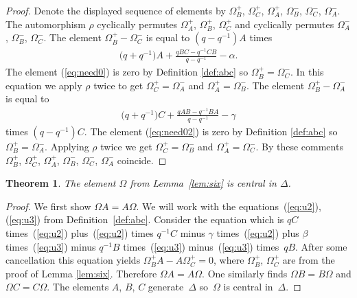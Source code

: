 \documentclass[11pt]{article}
\numberwithin{equation}{section}
\newtheorem{Theorem}{Theorem}[section]
\begin{document}
\begin{proof}
Denote the displayed sequence of elements by
$\Omega^+_B$,
$\Omega^+_C$,
$\Omega^+_A$,
$\Omega^-_B$,
$\Omega^-_C$,
$\Omega^-_A$.
The automorphism
$\rho$ cyclically permutes
$\Omega^+_A$,
$\Omega^+_B$,
$\Omega^+_C$
and cyclically permutes
$\Omega^-_A$, $\Omega^-_B$, $\Omega^-_C$.
The element
$\Omega^+_B-\Omega^-_C$
is
equal to $(q-q^{-1})A$ times
\begin{gather}
\label{eq:need0}
\big(q+q^{-1}\big)A + \frac{qBC-q^{-1}CB}{q-q^{-1}} -\alpha.
\end{gather}
The element
(\ref{eq:need0}) is zero by Def\/inition
\ref{def:abc} so
$\Omega^+_B=\Omega^-_C$.
In this equation we apply $\rho$ twice to get
$\Omega^+_C=\Omega^-_A$
and
$\Omega^+_A=\Omega^-_B$.
The element
$\Omega^+_B-\Omega^-_A$ is equal to
\begin{gather}
\label{eq:need02}
\big(q+q^{-1}\big)C + \frac{qAB-q^{-1}BA}{q-q^{-1}} -\gamma
\end{gather}
times $(q-q^{-1})C$.
The element
(\ref{eq:need02}) is zero by Def\/inition
\ref{def:abc} so
$\Omega^+_B=\Omega^-_A$.
Applying $\rho$ twice we get
$\Omega^+_C=\Omega^-_B$
and
$\Omega^+_A=\Omega^-_C$.
By these comments
$\Omega^+_B$,
$\Omega^+_C$,
$\Omega^+_A$,
$\Omega^-_B$,
$\Omega^-_C$,
$\Omega^-_A$ coincide.
\end{proof}

\begin{Theorem}
\label{lem:center}
The element $\Omega$ from
Lemma~{\rm \ref{lem:six}} is central in $\Delta $.
\end{Theorem}

\begin{proof}
We f\/irst show $\Omega A = A \Omega $.
We will work with the equations~(\ref{eq:u2}),
(\ref{eq:u3}) from Def\/inition~\ref{def:abc}. Consider the equation which is
$qC $ times~(\ref{eq:u2}) plus~(\ref{eq:u2}) times $q^{-1}C$
minus $\gamma$ times~(\ref{eq:u2})
plus $\beta$ times~(\ref{eq:u3})
minus
$q^{-1}B$ times~(\ref{eq:u3})
minus~(\ref{eq:u3}) times~$qB$.
After some cancellation this equation yields
$\Omega^+_B A- A\Omega^+_C =0$, where
$\Omega^+_B$, $\Omega^+_C$
are from the proof of Lemma
\ref{lem:six}.
Therefore
$\Omega A= A\Omega $.
 One similarly
f\/inds
$
\Omega B = B \Omega$ and
$
\Omega C = C \Omega$.
The elements $A$, $B$, $C$ generate~$\Delta $ so~$\Omega$ is central in~$\Delta$.
\end{proof}
\setcounter{section}{6}
\setcounter{subsection}{0}
\setcounter{subsubsection}{0}
\setcounter{Theorem}{4}
\setcounter{equation}{2}
\end{document}
